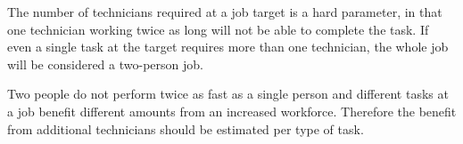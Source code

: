 The number of technicians required at a job target is a hard parameter, in that one technician working twice as long will not be able to complete the task. If even a single task at the target requires more than one technician, the whole job will be considered a two-person job. 

Two people do not perform twice as fast as a single person and different tasks at a job benefit different amounts from an increased workforce. Therefore the benefit from additional technicians should be estimated per type of task. 



